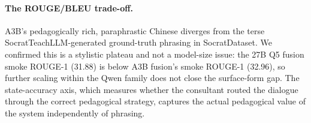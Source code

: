 \documentclass[11pt]{article}
\begin{document}
\begin{table}[t]
  \centering
  \small
  \caption{Headline full-run result ($n{=}681$, 4{,}171 turns for A3B; 4{,}294 turns for baseline). A3B fusion-think delivers a $+12.76$-point absolute lift in overall state accuracy with $3$--$5\times$ multipliers on the harder middle and closure stages, while ceding $\approx 14$ ROUGE-1 points to the SocratTeachLLM-trained baseline.}
  \label{tab:full}
\end{table}

\paragraph{The ROUGE/BLEU trade-off.} A3B's pedagogically rich, paraphrastic Chinese diverges from the terse SocratTeachLLM-generated ground-truth phrasing in SocratDataset. We confirmed this is a stylistic plateau and not a model-size issue: the 27B Q5 fusion smoke ROUGE-1 (31.88) is below A3B fusion's smoke ROUGE-1 (32.96), so further scaling within the Qwen family does not close the surface-form gap. The state-accuracy axis, which measures whether the consultant routed the dialogue through the correct pedagogical strategy, captures the actual pedagogical value of the system independently of phrasing.
\end{document}
